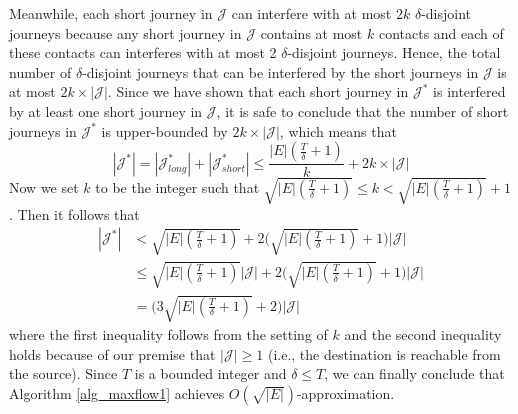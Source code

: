 \documentclass[10pt, conference, letterpaper]{IEEEtran}
\begin{document}
Meanwhile, each short journey in $\mathcal{J}$ can interfere with at most $2k$ $\delta$-disjoint journeys because any short journey in $\mathcal{J}$ contains at most $k$ contacts and each of these contacts can interferes with at most 2 $\delta$-disjoint journeys. Hence, the total number of $\delta$-disjoint journeys that can be interfered by the short journeys in $\mathcal{J}$ is at most $2k\times |\mathcal{J}|$. Since we have shown that each short journey in $\mathcal{J}^*$ is interfered by at least one short journey in $\mathcal{J}$, it is safe to conclude that the number of short journeys in $\mathcal{J}^*$ is upper-bounded by $2k\times |\mathcal{J}|$, which means that
\begin{equation}\label{ap}
|\mathcal{J}^*|=|\mathcal{J}^*_{long}|+|\mathcal{J}^*_{short}|\le \frac{|E|(\frac{T}{\delta}+1)}{k}+2k\times |\mathcal{J}|
\end{equation}
Now we set $k$ to be the integer such that $\sqrt{|E|(\frac{T}{\delta}+1)}\le k< \sqrt{|E|(\frac{T}{\delta}+1)}+1$. Then it follows that
\[
\begin{split}
|\mathcal{J}^*|&< \sqrt{|E|(\frac{T}{\delta}+1)}+2\Big(\sqrt{|E|(\frac{T}{\delta}+1)}+1\Big)|\mathcal{J}|\\
&\le \sqrt{|E|(\frac{T}{\delta}+1)}|\mathcal{J}|+2\Big(\sqrt{|E|(\frac{T}{\delta}+1)}+1\Big)|\mathcal{J}|\\
& = \Big(3\sqrt{|E|(\frac{T}{\delta}+1)}+2\Big)|\mathcal{J}|
\end{split}
\]
where the first inequality follows from the setting of $k$ and the second inequality holds because of our premise that $|\mathcal{J}|\ge 1$ (i.e., the destination is reachable from the source). Since $T$ is a bounded integer and $\delta\le T$, we can finally conclude that Algorithm \ref{alg_maxflow1} achieves $O(\sqrt{|E|})$-approximation.
\end{document}
